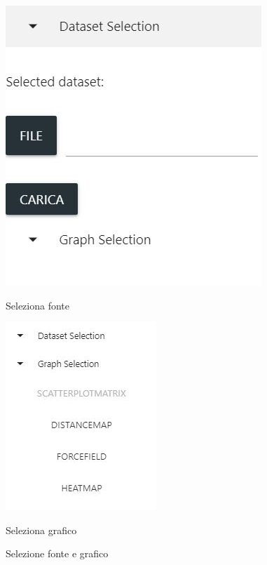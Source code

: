 \documentclass[../manuale_utente.tex]{subfiles}
\begin{document}
\begin{figure}
	\centering
	\begin{minipage}{.5\textwidth}
	  \centering
	  \includegraphics[width=.5\linewidth]{img/seleziona_dataset.jpg}
	  \caption{Seleziona fonte}
	  \label{fig:sub1}
	\end{minipage}%
	\begin{minipage}{.5\textwidth}
	  \centering
	  \includegraphics[width=.5\linewidth]{img/seleziona_grafico.jpg}
	  \caption{Seleziona grafico}
	  \label{fig:sub2}
	\end{minipage}
	\caption{Selezione fonte e grafico}
	\label{fig:test}
\end{figure}

\newpage
\end{document}
